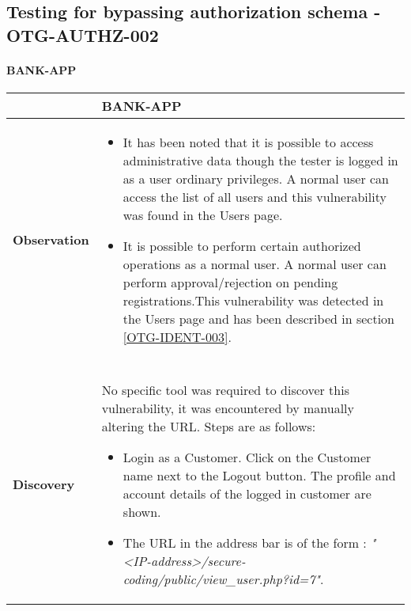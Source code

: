 \subsection{Testing for bypassing authorization schema - OTG-AUTHZ-002} \label{OTG-AUTHZ-002}

\paragraph{BANK-APP} \mbox{}
\begin{longtable*}{p{.20\textwidth} | p{.80\textwidth}}
    \hline
    & \textbf{BANK-APP} \\
    \hline
    \textbf{Observation} &
   \begin {itemize}
   	\item It has been noted that it is possible to access administrative data though the tester is logged in as a user ordinary privileges. A normal user can access the list of all users and this vulnerability was found in the Users page.
   
   \item It is possible to perform certain authorized operations as a normal user. A normal user can perform approval/rejection on pending registrations.This vulnerability was detected in the Users page and has been described in section \ref{OTG-IDENT-003}.
   
   \end{itemize}
    \\\\
    \textbf{Discovery} &
       No specific tool was required to discover this vulnerability, it was encountered by manually altering the URL. Steps are as follows:
          \begin{itemize}
      	    \item Login as a Customer. Click on the Customer name next to the Logout button. The profile and account details of the logged in customer are shown.
      	    
      	    \item The URL in the address bar is of the form : \textit{"<IP-address>/secure-coding/public/view\_user.php?id=7"}.
      	    

\end{itemize}
\end{longtable*}
